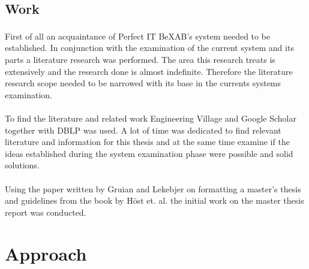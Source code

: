 \documentclass{cslthse-msc}
\newcommand{\bex}{BeX\textsuperscript{\textregistered}}
\begin{document}
\section{Work}
First of all an acquaintance of Perfect IT \bex AB's system needed to be established. In conjunction with the examination of the current system and its parts a literature research was performed. The area this research treats is extensively and the research done is almost indefinite. Therefore the literature research scope needed to be narrowed with its base in the currents systems examination.\\\\    
To find the literature and related work Engineering Village\cite{Enginvillage} and Google Scholar\cite{Googlescholar} together with DBLP\cite{DBLP} was used. A lot of time was dedicated to find relevant literature and information for this thesis and at the same time examine if the ideas established during the system examination phase were possible and solid solutions.\\\\
Using the paper written by Gruian and Lekebjer on formatting a master’s thesis\cite{Reportmall} and guidelines from the book by Höst et. al. \cite{regnell} the initial work on the master thesis report was conducted. 

\chapter{Approach}
\end{document}
